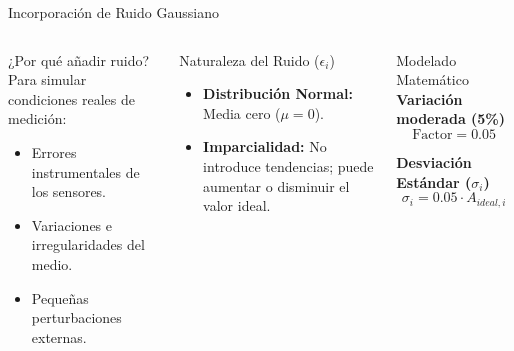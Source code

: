 

\begin{frame}{Incorporación de Ruido Gaussiano}

    \begin{columns}[T]
        \begin{block}{¿Por qué añadir ruido?}
            \scriptsize
            Para simular condiciones reales de medición:
            \begin{itemize}
                \item Errores instrumentales de los sensores.
                \item Variaciones e irregularidades del medio.
                \item Pequeñas perturbaciones externas.
            \end{itemize}
        \end{block}

        \vspace{0.2cm}

        \begin{block}{Naturaleza del Ruido ($\epsilon_i$)}
            \scriptsize
            \begin{itemize}
                \item \textbf{Distribución Normal:} Media cero ($\mu = 0$).
                \item \textbf{Imparcialidad:} No introduce tendencias; puede aumentar o disminuir el valor ideal.
            \end{itemize}
        \end{block}

        \begin{exampleblock}{Modelado Matemático}
            \centering
            \footnotesize
            \textbf{Variación moderada (5\%)}
            \[ \text{Factor} = 0.05 \]
            
            \textbf{Desviación Estándar ($\sigma_i$)}
            \[ \sigma_i = 0.05 \cdot A_{ideal,i} \]
            

\end{exampleblock}
\end{columns}
\end{frame}

